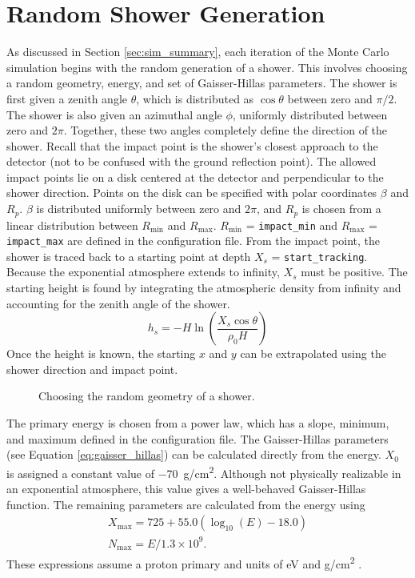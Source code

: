 \section{Random Shower Generation} \label{sec:shower_gen}

As discussed in Section \ref{sec:sim_summary}, each iteration of the Monte Carlo simulation begins with the random generation of a shower. This involves choosing a random geometry, energy, and set of Gaisser-Hillas parameters. The shower is first given a zenith angle $\theta$, which is distributed as $\cos{\theta}$ between zero and $\pi/2$. The shower is also given an azimuthal angle $\phi$, uniformly distributed between zero and $2\pi$. Together, these two angles completely define the direction of the shower. Recall that the impact point is the shower's closest approach to the detector (not to be confused with the ground reflection point). The allowed impact points lie on a disk centered at the detector and perpendicular to the shower direction. Points on the disk can be specified with polar coordinates $\beta$ and $R_p$. $\beta$ is distributed uniformly between zero and $2\pi$, and $R_p$ is chosen from a linear distribution between $R_\text{min}$ and $R_\text{max}$. $R_\text{min}$ = \texttt{impact\_min} and $R_\text{max}$ = \texttt{impact\_max} are defined in the configuration file. From the impact point, the shower is traced back to a starting point at depth $X_s$ = \texttt{start\_tracking}. Because the exponential atmosphere extends to infinity, $X_s$ must be positive. The starting height is found by integrating the atmospheric density from infinity and accounting for the zenith angle of the shower.
\begin{equation}
    h_s = -H \ln{\left(\frac{X_s \cos{\theta}}{\rho_0 H}\right)}
\end{equation}
Once the height is known, the starting $x$ and $y$ can be extrapolated using the shower direction and impact point.

\begin{figure}[!ht]
    \centering
    \caption{Choosing the random geometry of a shower.}
\end{figure}

The primary energy is chosen from a power law, which has a slope, minimum, and maximum defined in the configuration file. The Gaisser-Hillas parameters (see Equation \ref{eq:gaisser_hillas}) can be calculated directly from the energy. $X_0$ is assigned a constant value of \SI{-70}{g/cm^2}. Although not physically realizable in an exponential atmosphere, this value gives a well-behaved Gaisser-Hillas function. The remaining parameters are calculated from the energy using
\begin{gather}
    X_\text{max} = 725 + 55.0 (\log_{10}(E) - 18.0) \\
    N_\text{max} = E / 1.3 \times 10^9.
\end{gather}
These expressions assume a proton primary and units of \si{eV} and \si{g/cm^2} \cite{abuzayyad2000hires}.

